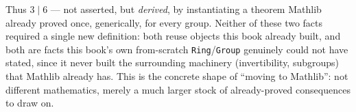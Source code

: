 Thus \(3 \mid 6\) --- not asserted, but \emph{derived}, by instantiating a theorem Mathlib already proved once, generically, for every group. Neither of these two facts required a single new definition: both reuse objects this book already built, and both are facts this book's own from-scratch \texttt{Ring}/\texttt{Group} genuinely could not have stated, since it never built the surrounding machinery (invertibility, subgroups) that Mathlib already has. This is the concrete shape of ``moving to Mathlib'': not different mathematics, merely a much larger stock of already-proved consequences to draw on.
